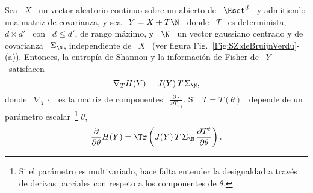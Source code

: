 \begin{teorema}
\label{Teo:SZ:DeBruijn}
%
  Sea \ $X$ \  un vector aleatorio continuo sobre un abierto  de \ $\Rset^d$ \ y
  admitiendo una matriz de covarianza, y sea \  $Y = X + T \N$ \ donde \ $T$
  \ es determinista, $d  \times d'$ \ con \ $ d \le d'$,  de rango m\'aximo, y \
  $\N$ \  un vector  gaussiano centrado y  de covarianza  \ $\Sigma_\N$,
  independiente  de \  $X$ \  (ver  figura Fig.~\ref{Fig:SZ:deBruijnVerdu}-(a)).
  Entonces, la  entrop\'ia de Shannon  y la informaci\'on  de Fisher de \  $Y$ \
  satisfacen
  \[
  \nabla_T H(Y) = J(Y) \, T \, \Sigma_\N,
  \]
  donde \ $\nabla_T \, \cdot$ \ es la matriz de componentes \ $\frac{\partial \,
    \cdot}{\partial T_{i,j}}$.  Si \ $T = T(\theta)$ \ depende de un par\'ametro
  escalar~\footnote{Si el  par\'ametro es  multivariado, hace falta  entender la
    desigualdad a trav\'es de derivas parciales con respeto a los componentes de
    $\theta$.}  $\theta$,
  \[
  \frac{\partial}{\partial \theta}  H(Y) = \Tr\left( J(Y) \,  T \, \Sigma_\N
    \, \frac{\partial T^t}{\partial \theta} \right).
  \]
\end{teorema}
%
